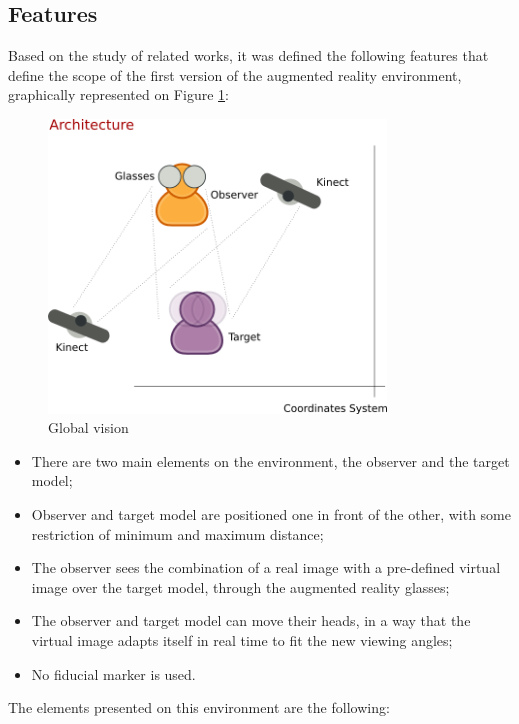 \documentclass[msc, a4paper, classic, en]{ufbathesis}
\begin{document}
\subsection{Features}

Based on the study of related works, it was defined the following features that define the scope of the first version of the augmented
reality environment, graphically represented on Figure \ref{fig:diagram}:

\begin{figure}
\centering
\includegraphics[width=0.8\textwidth]{images/diagram.png}
\caption{Global vision}
\label{fig:diagram}
\end{figure}

\begin{itemize}
  \item There are two main elements on the environment, the observer and the target model;
  \item Observer and target model are positioned one in front of the other, with some restriction of minimum and maximum distance;
  \item The observer sees the combination of a real image with a pre-defined virtual image over the target model, through the augmented
        reality glasses;
  \item The observer and target model can move their heads, in a way that the virtual image adapts itself in real time to fit the new
        viewing angles;
  \item No fiducial marker is used.
\end{itemize}

The elements presented on this environment are the following:
\end{document}
